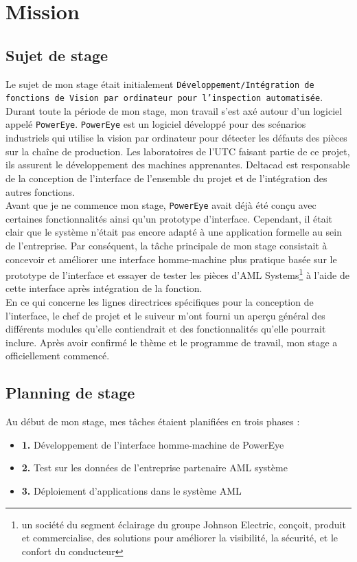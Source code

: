 \chapter{Mission}
\section{Sujet de stage}
Le sujet de mon stage était initialement \texttt{Développement/Intégration de fonctions de Vision par ordinateur pour l’inspection automatisée}. Durant toute la période de mon stage, mon travail s'est axé autour d'un logiciel appelé \texttt{PowerEye}. \texttt{PowerEye} est un logiciel développé pour des scénarios industriels qui utilise la vision par ordinateur pour détecter les défauts des pièces sur la chaîne de production. Les laboratoires de l’UTC faisant partie de ce projet, ils assurent le développement des machines apprenantes. Deltacad est responsable de la conception de l'interface de l'ensemble du projet et de l'intégration des autres fonctions. \\

Avant que je ne commence mon stage, \texttt{PowerEye} avait déjà été conçu avec certaines fonctionnalités ainsi qu'un prototype d'interface. Cependant, il était clair que le système n'était pas encore adapté à une application formelle au sein de l'entreprise. Par conséquent, la tâche principale de mon stage consistait à concevoir et améliorer une interface homme-machine plus pratique basée sur le prototype de l'interface et essayer de tester les pièces d'AML Systems\footnote{un société du segment éclairage du groupe Johnson Electric, conçoit, produit et commercialise, des solutions pour améliorer la visibilité, la sécurité, et le confort du conducteur} à l'aide de cette interface après intégration de la fonction.\\

En ce qui concerne les lignes directrices spécifiques pour la conception de l'interface, le chef de projet et le suiveur m'ont fourni un aperçu général des différents modules qu'elle contiendrait et des fonctionnalités qu'elle pourrait inclure. Après avoir confirmé le thème et le programme de travail, mon stage a officiellement commencé.\\

\newpage
\section{Planning de stage}
Au début de mon stage, mes tâches étaient planifiées en trois phases : 
\begin{itemize}
    \item \textbf{1. }Développement de l'interface homme-machine de PowerEye 
    \item \textbf{2. }Test sur les données de l'entreprise partenaire AML système
    \item \textbf{3. }Déploiement d'applications dans le système AML
\end{itemize}

